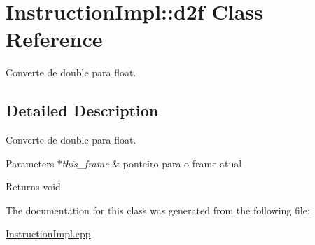 \hypertarget{class_instruction_impl_1_1d2f}{}\section{Instruction\+Impl\+:\+:d2f Class Reference}
\label{class_instruction_impl_1_1d2f}


Converte de double para float.  




\subsection{Detailed Description}
Converte de double para float. 


\begin{DoxyParams}{Parameters}
{\em $\ast$this\+\_\+frame} & ponteiro para o frame atual \\
\hline
\end{DoxyParams}
\begin{DoxyReturn}{Returns}
void 
\end{DoxyReturn}


The documentation for this class was generated from the following file\+:\begin{DoxyCompactItemize}
\item 
\hyperlink{_instruction_impl_8cpp}{Instruction\+Impl.\+cpp}\end{DoxyCompactItemize}
